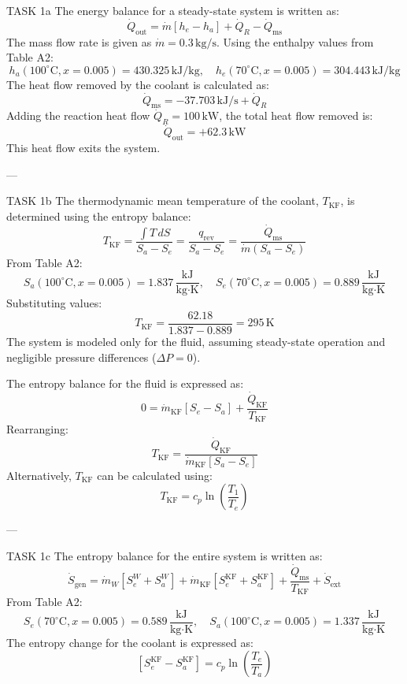 TASK 1a  
The energy balance for a steady-state system is written as:  
\[
\dot{Q}_{\text{out}} = \dot{m} \left[ h_e - h_a \right] + \dot{Q}_R - \dot{Q}_{\text{ms}}
\]  
The mass flow rate is given as \( \dot{m} = 0.3 \, \text{kg/s} \). Using the enthalpy values from Table A2:  
\[
h_a(100^\circ\text{C}, x = 0.005) = 430.325 \, \text{kJ/kg}, \quad h_e(70^\circ\text{C}, x = 0.005) = 304.443 \, \text{kJ/kg}
\]  
The heat flow removed by the coolant is calculated as:  
\[
\dot{Q}_{\text{ms}} = -37.703 \, \text{kJ/s} + \dot{Q}_R
\]  
Adding the reaction heat flow \( \dot{Q}_R = 100 \, \text{kW} \), the total heat flow removed is:  
\[
\dot{Q}_{\text{out}} = +62.3 \, \text{kW}
\]  
This heat flow exits the system.

---

TASK 1b  
The thermodynamic mean temperature of the coolant, \( T_{\text{KF}} \), is determined using the entropy balance:  
\[
T_{\text{KF}} = \frac{\int T \, dS}{S_a - S_e} = \frac{q_{\text{rev}}}{S_a - S_e} = \frac{\dot{Q}_{\text{ms}}}{\dot{m} (S_a - S_e)}
\]  
From Table A2:  
\[
S_a(100^\circ\text{C}, x = 0.005) = 1.837 \, \frac{\text{kJ}}{\text{kg·K}}, \quad S_e(70^\circ\text{C}, x = 0.005) = 0.889 \, \frac{\text{kJ}}{\text{kg·K}}
\]  
Substituting values:  
\[
T_{\text{KF}} = \frac{62.18}{1.837 - 0.889} = 295 \, \text{K}
\]  
The system is modeled only for the fluid, assuming steady-state operation and negligible pressure differences (\( \Delta P = 0 \)).

The entropy balance for the fluid is expressed as:  
\[
0 = \dot{m}_{\text{KF}} \left[ S_e - S_a \right] + \frac{\dot{Q}_{\text{KF}}}{T_{\text{KF}}}
\]  
Rearranging:  
\[
T_{\text{KF}} = \frac{\dot{Q}_{\text{KF}}}{\dot{m}_{\text{KF}} \left[ S_a - S_e \right]}
\]  
Alternatively, \( T_{\text{KF}} \) can be calculated using:  
\[
T_{\text{KF}} = c_p \ln \left( \frac{T_1}{T_e} \right)
\]

---

TASK 1c  
The entropy balance for the entire system is written as:  
\[
\dot{S}_{\text{gen}} = \dot{m}_W \left[ S_e^W + S_a^W \right] + \dot{m}_{\text{KF}} \left[ S_e^{\text{KF}} + S_a^{\text{KF}} \right] + \frac{\dot{Q}_{\text{ms}}}{T_{\text{KF}}} + \dot{S}_{\text{ext}}
\]  
From Table A2:  
\[
S_e(70^\circ\text{C}, x = 0.005) = 0.589 \, \frac{\text{kJ}}{\text{kg·K}}, \quad S_a(100^\circ\text{C}, x = 0.005) = 1.337 \, \frac{\text{kJ}}{\text{kg·K}}
\]  
The entropy change for the coolant is expressed as:  
\[
\left[ S_e^{\text{KF}} - S_a^{\text{KF}} \right] = c_p \ln \left( \frac{T_e}{T_a} \right)
\]  

